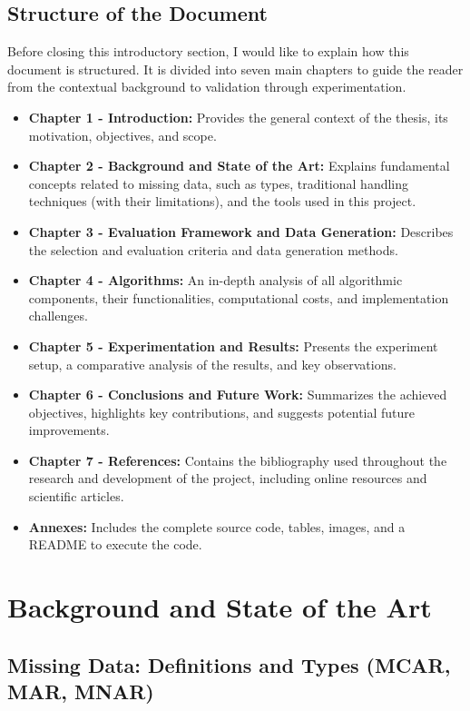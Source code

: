 \documentclass[a4paper,12pt]{article}
\begin{document}
\subsection{Structure of the Document}
Before closing this introductory section, I would like to explain how this document is structured. It is divided into seven main chapters to guide the reader from the contextual background to validation through experimentation.

\begin{itemize}
    \item \textbf{Chapter 1 - Introduction:} Provides the general context of the thesis, its motivation, objectives, and scope.
    \item \textbf{Chapter 2 - Background and State of the Art:} Explains fundamental concepts related to missing data, such as types, traditional handling techniques (with their limitations), and the tools used in this project.
    \item \textbf{Chapter 3 - Evaluation Framework and Data Generation:} Describes the selection and evaluation criteria and data generation methods.
    \item \textbf{Chapter 4 - Algorithms:} An in-depth analysis of all algorithmic components, their functionalities, computational costs, and implementation challenges.
    \item \textbf{Chapter 5 - Experimentation and Results:} Presents the experiment setup,  a comparative analysis of the results, and key observations.
    \item \textbf{Chapter 6 - Conclusions and Future Work:} Summarizes the achieved objectives, highlights key contributions, and suggests potential future improvements.
    \item \textbf{Chapter 7 - References:} Contains the bibliography used throughout the research and development of the project, including online resources and scientific articles.
    \item \textbf{Annexes:} Includes the complete source code, tables, images, and a README to execute the code.
\end{itemize}
\newpage\section{Background and State of the Art}

\subsection{Missing Data: Definitions and Types (MCAR, MAR, MNAR)}
\end{document}
